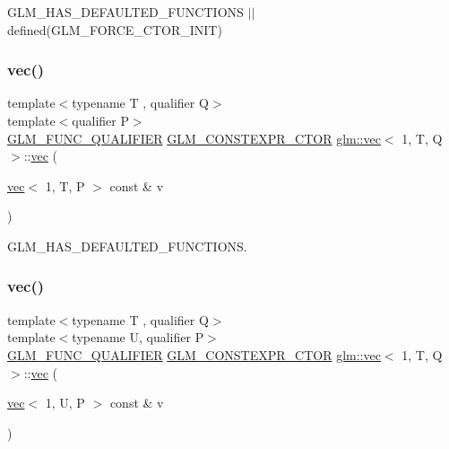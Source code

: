 G\+L\+M\+\_\+\+H\+A\+S\+\_\+\+D\+E\+F\+A\+U\+L\+T\+E\+D\+\_\+\+F\+U\+N\+C\+T\+I\+O\+NS $\vert$$\vert$ defined(\+G\+L\+M\+\_\+\+F\+O\+R\+C\+E\+\_\+\+C\+T\+O\+R\+\_\+\+I\+N\+I\+T) 

\mbox{\label{structglm_1_1vec_3_011_00_01_t_00_01_q_01_4_a65d7b47aa379986d75f0e64f7141f5d0}} 
\subsubsection{\texorpdfstring{vec()}{vec()}\hspace{0.1cm}{\footnotesize\ttfamily [10/14]}}
{\footnotesize\ttfamily template$<$typename T , qualifier Q$>$ \\
template$<$qualifier P$>$ \\
\mbox{\hyperlink{setup_8hpp_a33fdea6f91c5f834105f7415e2a64407}{G\+L\+M\+\_\+\+F\+U\+N\+C\+\_\+\+Q\+U\+A\+L\+I\+F\+I\+ER}} \mbox{\hyperlink{setup_8hpp_ad34178a09666081abdb573c14d1f4a5a}{G\+L\+M\+\_\+\+C\+O\+N\+S\+T\+E\+X\+P\+R\+\_\+\+C\+T\+OR}} \mbox{\hyperlink{structglm_1_1vec}{glm\+::vec}}$<$ 1, T, Q $>$\+::\mbox{\hyperlink{structglm_1_1vec}{vec}} (\begin{DoxyParamCaption}\item[{\mbox{\hyperlink{structglm_1_1vec}{vec}}$<$ 1, T, P $>$ const \&}]{v }\end{DoxyParamCaption})}



G\+L\+M\+\_\+\+H\+A\+S\+\_\+\+D\+E\+F\+A\+U\+L\+T\+E\+D\+\_\+\+F\+U\+N\+C\+T\+I\+O\+NS. 

\mbox{\label{structglm_1_1vec_3_011_00_01_t_00_01_q_01_4_ab8d935770c08c100f574755cf3ab3206}} 
\subsubsection{\texorpdfstring{vec()}{vec()}\hspace{0.1cm}{\footnotesize\ttfamily [11/14]}}
{\footnotesize\ttfamily template$<$typename T , qualifier Q$>$ \\
template$<$typename U, qualifier P$>$ \\
\mbox{\hyperlink{setup_8hpp_a33fdea6f91c5f834105f7415e2a64407}{G\+L\+M\+\_\+\+F\+U\+N\+C\+\_\+\+Q\+U\+A\+L\+I\+F\+I\+ER}} \mbox{\hyperlink{setup_8hpp_ad34178a09666081abdb573c14d1f4a5a}{G\+L\+M\+\_\+\+C\+O\+N\+S\+T\+E\+X\+P\+R\+\_\+\+C\+T\+OR}} \mbox{\hyperlink{structglm_1_1vec}{glm\+::vec}}$<$ 1, T, Q $>$\+::\mbox{\hyperlink{structglm_1_1vec}{vec}} (\begin{DoxyParamCaption}\item[{\mbox{\hyperlink{structglm_1_1vec}{vec}}$<$ 1, U, P $>$ const \&}]{v }\end{DoxyParamCaption})}

